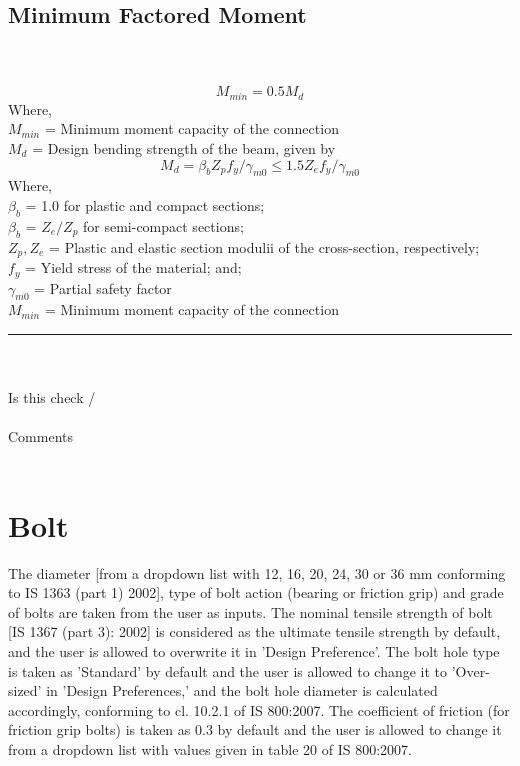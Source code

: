 \documentclass[11.5pt,a4paper,oneside]{report}
\newcommand{\okornot}{ \vspace{15mm} \hrule
	\noindent \\ \\
	Is this check \qquad
	\CheckBox[checked=False, name= ok]{\textbf{Ok}} \qquad / 
	\CheckBox[checked=False, name= notok]{\textbf{Not Ok}}\\ \\
	Comments \\ \\
	\noindent
	\TextField[name=multilinetextbox, multiline=true, width=1.0\linewidth,height=2in]{}}
\begin{document}
\begin{Form}
\section{Minimum Factored Moment} 
\qquad \qquad[Reference: Cl. 10.7, b-1, IS 800 : 2007] \\ \\
	\begin{equation}\label{eq:cl_10.7b, IS 800}
		M_{min} = 0.5 M_d 
	\end{equation}
	Where, \\
		\indent $M_{min}$ = Minimum moment capacity of the connection \\
		\indent $M_d$ = Design bending strength of the beam, given by
	\begin{equation} \label{eq:cl_8.2.1.2a, IS 800}
		M_d = \beta_b Z_p f_y / \gamma_{m0} \le 1.5 Z_e f_y / \gamma_{m0} 
	\end{equation}
	Where, \\
		\indent $\beta_b$ = 1.0 for plastic and compact sections;\\
		\indent $\beta_b$ = $Z_e/Z_p$ for semi-compact sections;\\
		\indent $Z_p, Z_e$ = Plastic and elastic section modulii of the cross-section, respectively; \\
		\indent $f_y$ = Yield stress of the material; and;\\
		\indent $\gamma_{m0}$ = Partial safety factor \\
		\indent $M_{min}$ = Minimum moment capacity of the connection

\okornot

\chapter{Bolt}
%
The diameter [from a dropdown list with 12, 16, 20, 24, 30 or 36 mm conforming to IS 1363 (part 1) 2002], type of bolt action (bearing or friction grip) and grade of bolts are taken from the user as inputs. The nominal tensile strength of bolt [IS 1367 (part 3): 2002] is considered as the ultimate tensile strength by default, and the user is allowed to overwrite it in 'Design Preference'. The bolt hole type is taken as 'Standard' by default and the user is allowed to change it to 'Over-sized' in 'Design Preferences,' and the bolt hole diameter is calculated accordingly, conforming to cl. 10.2.1 of IS 800:2007. The coefficient of friction (for friction grip bolts) is taken as 0.3 by default and the user is allowed to change it from a dropdown list with values given in table 20 of IS 800:2007. 

\end{Form}
\end{document}
